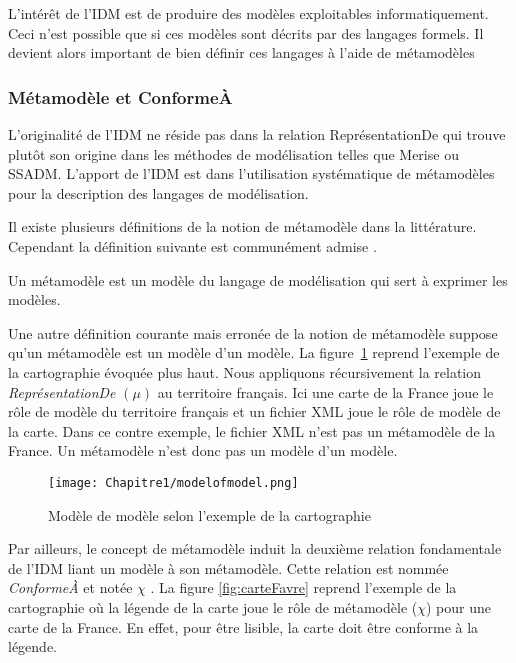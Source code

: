 L'intérêt de l'IDM est de produire des modèles exploitables informatiquement. 
Ceci n'est possible que si ces modèles sont décrits par des langages formels. Il 
devient alors important de bien définir ces langages à l'aide de métamodèles

\subsubsection{Métamodèle et ConformeÀ}
L'originalité de l'IDM ne réside pas dans la relation ReprésentationDe qui 
trouve plutôt son origine dans les méthodes de modélisation telles que Merise ou 
SSADM. L'apport de l'IDM est dans l'utilisation systématique de métamodèles pour 
la description des langages de modélisation. 

Il existe plusieurs définitions de la notion de métamodèle dans la littérature. 
Cependant la définition suivante est communément admise 
\cite{bezivin2004rapport}.

\begin{theorem}
Un métamodèle est un modèle du langage de modélisation qui sert à exprimer les 
modèles.
\end{theorem}
Une autre définition courante mais erronée de la notion de métamodèle suppose 
qu'un métamodèle est un modèle d'un modèle. La figure~\ref{fig:modelofmodel} 
reprend l'exemple de la cartographie évoquée plus haut. Nous appliquons 
récursivement la relation \textit{ReprésentationDe} $(\mu)$ au territoire 
français. Ici une carte de la France joue le rôle de modèle du territoire 
français et un fichier XML joue le rôle de modèle de la carte. Dans ce contre 
exemple, le fichier XML n'est pas un métamodèle de la France. Un métamodèle 
n'est donc pas un modèle d'un modèle.

\begin{figure}[!htbp]
 \begin{center}
  \texttt{[image: Chapitre1/modelofmodel.png]}
 \end{center}
 \caption{Modèle de modèle selon l'exemple de la cartographie 
\protect\cite{favre2006ingenierie}}
 \label{fig:modelofmodel}
\end{figure}

Par ailleurs, le concept de métamodèle induit la deuxième relation fondamentale 
de l'IDM liant un modèle à son métamodèle. Cette relation est nommée 
\textit{ConformeÀ} et notée $\chi$ \cite{bezivin2004search} 
\cite{favre2004towards}. La figure \ref{fig:carteFavre} reprend l'exemple de la 
cartographie où la légende de la carte joue le rôle de métamodèle ($\chi$) pour 
une carte de la France. En effet, pour être lisible, la carte doit être conforme 
à la légende.

